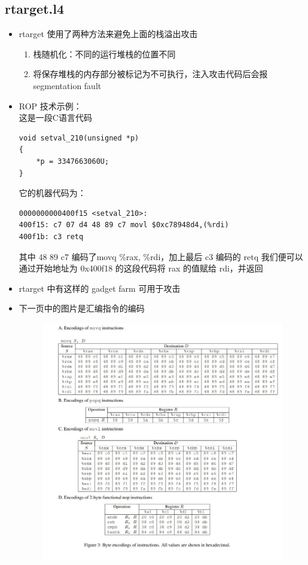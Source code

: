 \documentclass[12pt, a4paper, oneside]{ctexart}
\begin{document}
\subsection{rtarget.l4}
\begin{itemize}
    \item rtarget 使用了两种方法来避免上面的栈溢出攻击
    \begin{enumerate}
        \item 栈随机化：不同的运行堆栈的位置不同
        \item 将保存堆栈的内存部分被标记为不可执行，注入攻击代码后会报segmentation fault
    \end{enumerate}
    \item ROP 技术示例：\\
    这是一段C语言代码
\begin{lstlisting}
void setval_210(unsigned *p)
{
    *p = 3347663060U;
}
\end{lstlisting}
    它的机器代码为：
\begin{lstlisting}
0000000000400f15 <setval_210>:
400f15: c7 07 d4 48 89 c7 movl $0xc78948d4,(%rdi)
400f1b: c3 retq
\end{lstlisting}
    其中 48 89 c7 编码了movq \%rax, \%rdi，加上最后 c3 编码的 retq
    我们便可以通过开始地址为 0x400f18 的这段代码将 rax 的值赋给 rdi，并返回
    \item rtarget 中有这样的 gadget farm 可用于攻击
    \item 下一页中的图片是汇编指令的编码
\begin{figure}[htbp]
    \includegraphics[scale=0.7]{image/2.4-1.jpeg}

\end{figure}
\end{itemize}
\end{document}
